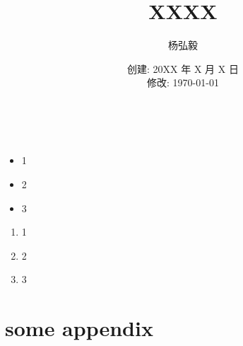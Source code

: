 \documentclass[11pt]{article}
\title{XXXX}
\author{杨弘毅}
\date{创建: 20XX 年 X 月 X 日 \\修改: \today}
\begin{document}
\maketitle

\section{}

\subsection{}

\subsubsection{}

\begin{equation*}
\end{equation*}

\begin{align*}
\end{align*}

\begin{itemize}
	\setlength{\itemsep}{0em}
	\item 1
	\item 2
	\item 3
\end{itemize}

\begin{enumerate}
	\setlength{\itemsep}{0em}
	\item 1
	\item 2
	\item 3
\end{enumerate}

\begin{figure}[ht!]
	\centering
	\caption{}
\end{figure}



\appendix
\section{some appendix}
\end{document}
